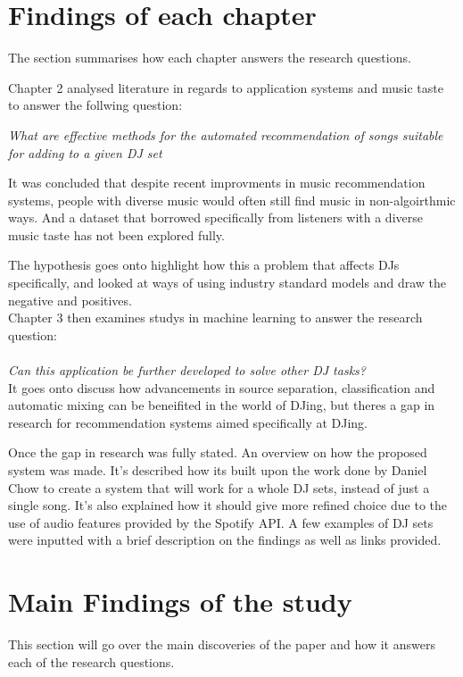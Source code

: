 \section{Findings of each chapter}
The section summarises how each chapter answers the research questions.

Chapter 2 analysed literature in regards to application systems and music taste to answer the follwing question: 

\textit{What are effective methods for the automated recommendation of songs suitable
	for adding to a given DJ set}

It was concluded that despite recent improvments in music recommendation systems, people with diverse music would often still find music in non-algoirthmic ways. And a dataset that borrowed specifically from listeners with a diverse music taste has not been explored fully.

The hypothesis goes onto highlight how this a problem that affects DJs specifically, and looked at ways of using industry standard models and draw the negative and positives.
\\

Chapter 3 then examines studys in machine learning to answer the research question:
\\
\\
\textit{Can this application be further developed to solve other DJ tasks?}
\\

It goes onto discuss how advancements in source separation, classification and automatic mixing can be beneifited in the world of DJing, but theres a gap in research for recommendation systems aimed specifically at DJing.

Once the gap in research was fully stated. An overview on how the proposed system was made. It's described how its built upon the work done by Daniel Chow to create a system that will work for a whole DJ sets, instead of just a single song. It's also explained how it should give more refined choice due to the use of audio features provided by the Spotify API. A few examples of DJ sets were inputted with a brief description on the findings as well as links provided.

\section{Main Findings of the study}

This section will go over the main discoveries of the paper and how it answers each of the research questions.

